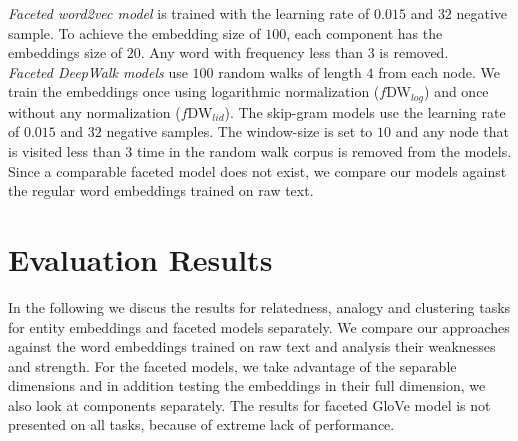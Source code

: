 \noindent
\emph{Faceted word2vec model} is trained with the learning rate of $0.015$ and $32$ negative sample. To achieve the embedding size of $100$, each component has the embeddings size of $20$. Any word with frequency less than $3$ is removed. \\

\noindent
\emph{Faceted DeepWalk models} use $100$ random walks of length $4$ from each node. We train the embeddings once using logarithmic normalization ($f$DW$_{log}$) and once without any normalization ($f$DW$_{lid}$). The skip-gram models use the learning rate of $0.015$ and $32$ negative samples. The window-size is set to $10$ and any node that is visited less than $3$ time in the random walk corpus is removed from the models. 
\\

Since a comparable faceted model does not exist, we compare our models against the regular word embeddings trained on raw text. 

\section{Evaluation Results}\label{sec:eval_results}
In the following we discus the results for relatedness, analogy and clustering tasks for entity embeddings and faceted models separately. We compare our approaches against the word embeddings trained on raw text and analysis their weaknesses and strength. For the faceted models, we take advantage of the separable dimensions and in addition testing the embeddings in their full dimension, we also look at components separately. The results for faceted GloVe model is not presented on all tasks, because of extreme lack of performance. 
